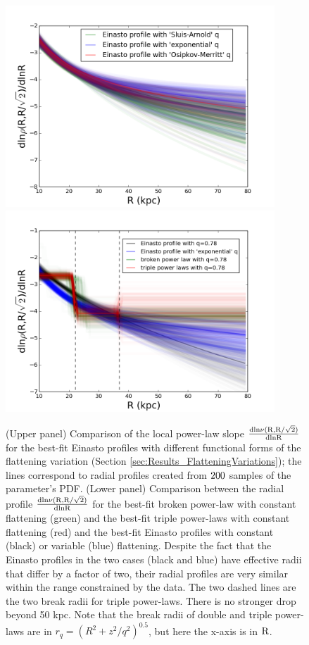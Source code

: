 \documentclass[12pt,preprint]{aastex}
\begin{document}
\begin{figure}[htbp]
\centering
\includegraphics[width=0.9\textwidth,height=0.45\textheight]{density_45d_compareqv}
\includegraphics[width=0.9\textwidth,height=0.45\textheight]{density_45d_mcmc}
\caption{(Upper panel) Comparison of the local power-law slope $\rm \frac{dln\nu(R,R/\sqrt{2})}{dlnR}$ for the best-fit Einasto profiles with different functional forms of the flattening variation (Section  \ref{sec:Results_FlatteningVariations}); the lines correspond to radial profiles created from $\rm 200$ samples of the parameter's PDF. (Lower panel) Comparison between the radial profile $\rm \frac{dln\nu(R,R/\sqrt{2})}{dlnR}$ for the best-fit broken power-law with constant flattening (green) and the best-fit triple power-laws with constant flattening (red) and the best-fit Einasto profiles with constant (black) or variable (blue) flattening. Despite the fact that the Einasto profiles in the two cases (black and blue) have effective radii that differ by a factor of two, their radial profiles are very similar within the range constrained by the data. The two dashed lines are the two break radii for triple power-laws. There is no stronger drop beyond 50 kpc. Note that the break radii of double and triple power-laws are in $r_q=(R^2+z^2/q^2)^{0.5}$, but here the x-axis is in $\rm R$.}
\label{f:fdensity}
\end{figure}
\end{document}
